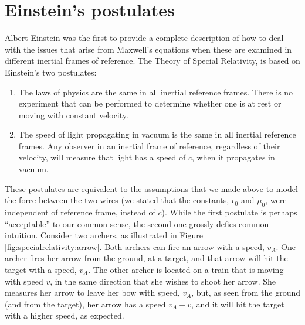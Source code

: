 \section{Einstein's postulates}
Albert Einstein was the first to provide a complete description of how to deal with the issues that arise from Maxwell's equations when these are examined in different inertial frames of reference. The Theory of Special Relativity, is based on Einstein's two postulates:
\begin{enumerate}
\item The laws of physics are the same in all inertial reference frames. There is no experiment that can be performed to determine whether one is at rest or moving with constant velocity.
\item The speed of light propagating in vacuum is the same in all inertial reference frames. Any observer in an inertial frame of reference, regardless of their velocity, will measure that light has a speed of $c$, when it propagates in vacuum. 
\end{enumerate}
These postulates are equivalent to the assumptions that we made above to model the force between the two wires (we stated that the constants, $\epsilon_0$ and $\mu_0$, were independent of reference frame, instead of $c$). While the first postulate is perhaps ``acceptable'' to our common sense, the second one grossly defies common intuition. Consider two archers, as illustrated in Figure \ref{fig:specialrelativity:arrow}.
Both archers can fire an arrow with a speed, $v_A$. One archer fires her arrow from the ground, at a target, and that arrow will hit the target with a speed, $v_A$. The other archer is located on a train that is moving with speed $v$, in the same direction that she wishes to shoot her arrow. She measures her arrow to leave her bow with speed, $v_A$, but, as seen from the ground (and from the target), her arrow has a speed $v_A+v$, and it will hit the target with a higher speed, as expected.

